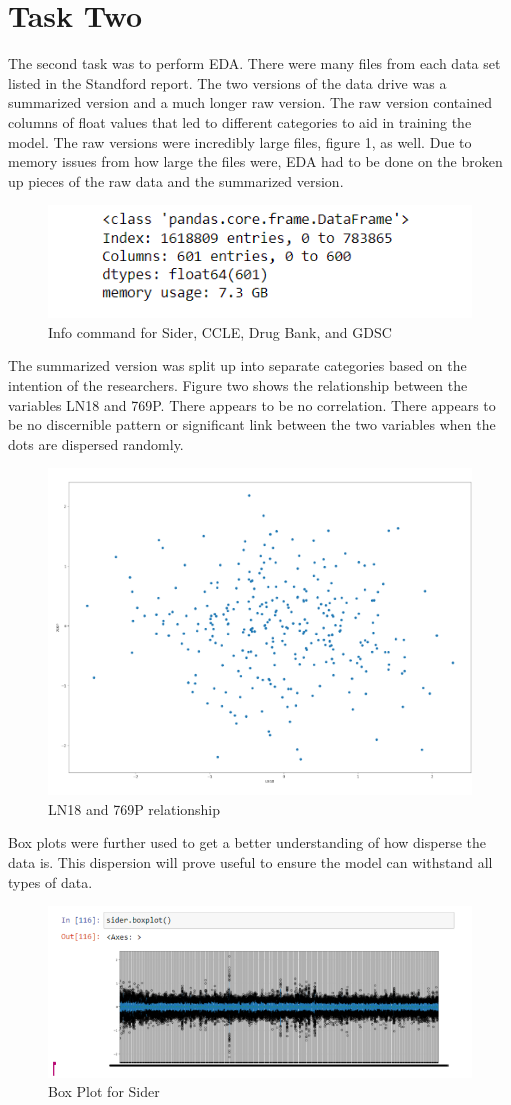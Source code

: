 \documentclass{article}
\begin{document}
\section{Task Two}
The second task was to perform EDA. There were many files from each data set listed in the Standford report. The two versions of the data drive was a summarized version and a much longer raw version. The raw version contained columns of float values that led to different categories to aid in training the model. The raw versions were incredibly large files, figure 1, as well. Due to memory issues from how large the files were, EDA had to be done on the broken up pieces of the raw data and the summarized version. 
\begin{figure}
    \centering
    \includegraphics[width=0.5\linewidth]{1.png}
    \caption{Info command for Sider, CCLE, Drug Bank, and GDSC}
    \label{fig:enter-label}
\end{figure}
The summarized version was split up into separate categories based on the intention of the researchers. Figure two shows the relationship between the variables LN18 and 769P. There appears to be no correlation. There appears to be no discernible pattern or significant link between the two variables when the dots are dispersed randomly.
\begin{figure}
    \centering
    \includegraphics[width=0.5\linewidth]{2.png}
    \caption{LN18 and 769P relationship}
    \label{fig:enter-label}
\end{figure}
Box plots were further used to get a better understanding of how disperse the data is. This dispersion will prove useful to ensure the model can withstand all types of data.
\begin{figure}
    \centering
    \includegraphics[width=0.5\linewidth]{3.png}
    \caption{Box Plot for Sider}
    \label{fig:enter-label}
\end{figure}
\end{document}
